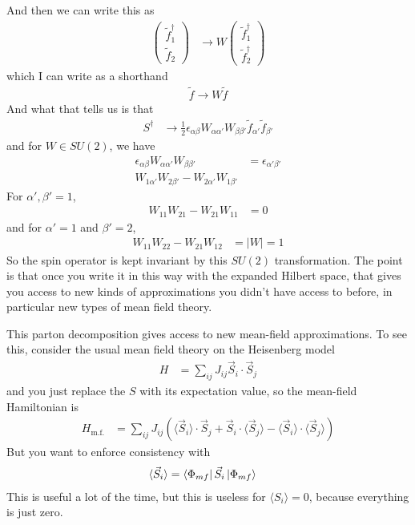 And then we can write this as
\begin{align}
    \begin{pmatrix}
        \tilde{f}_1^\dagger\\
        \tilde{f}_2
    \end{pmatrix}
    &\to
    W
    \begin{pmatrix}
        \tilde{f}_1^\dagger\\
        \tilde{f}_2^\dagger
    \end{pmatrix}
\end{align}
which I can write as a shorthand
\begin{align}
    \tilde{f} \to W \tilde{f}
\end{align}
And what that tells us is that
\begin{align}
    S^\dagger &\to
    \frac{1}{2} \epsilon_{\alpha\beta} W_{\alpha\alpha'}
    W_{\beta\beta'} \tilde{f}_{\alpha'}
    \tilde{f}_{\beta'}
\end{align}
and for $W\in SU(2)$,
we have
\begin{align}
    \epsilon_{\alpha\beta}
    W_{\alpha\alpha'}
    W_{\beta\beta'}
    &=
    \epsilon_{\alpha'\beta'}\\
    W_{1\alpha'}
    W_{2\beta'}
    -
    W_{2\alpha'}
    W_{1\beta'}
\end{align}
For $\alpha',\beta'=1$,
\begin{align}
    W_{11}W_{21} - W_{21}W_{11} &=0
\end{align}
and for
$\alpha'=1$ and $\beta'=2$,
\begin{align}
    W_{11} W_{22} - W_{21} W_{12} &= |W| = 1
\end{align}
So the spin operator is kept invariant by this $SU(2)$ transformation.
The point is that once you write it in this way with the expanded Hilbert space,
that gives you access to new kinds of approximations you didn't have access to
before,
in particular new types of mean field theory.

This parton decomposition gives access to new mean-field approximations.
To see this,
consider the usual mean field theory on the Heisenberg model
\begin{align}
    H
    &=
    \sum_{ij} J_{ij} \vec{S}_{i} \cdot \vec{S}_{j}
\end{align}
and you just replace the $S$ with its expectation value,
so the mean-field Hamiltonian is
\begin{align}
    H_{\mathrm{m.f.}}
    &=
    \sum_{ij}
    J_{ij}
    \left( 
    \langle\vec{S}_i\rangle
    \cdot
    \vec{S}_j
    +
    \vec{S}_i\cdot
    \langle \vec{S}_j \rangle
    -
    \langle\vec{S}_i\rangle
    \cdot
    \langle\vec{S}_j\rangle
    \right)
\end{align}
But you want to enforce consistency with
\begin{align}
    \langle \vec{S}_i \rangle
    &=
    \bra{\Phi_{mf}}
    \vec{S}_i
    \ket{\Phi_{mf}}
\end{align}
This is useful a lot of the time,
but this is useless for $\langle S_i \rangle=0$,
because everything is just zero.

